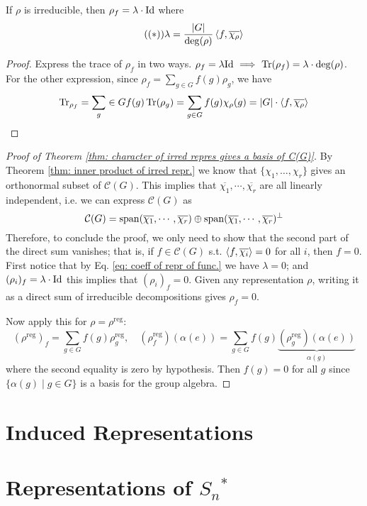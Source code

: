 \documentclass{article}
\begin{document}
\begin{proposition}
    If $\rho$ is irreducible, then $\rho_f = \lambda \cdot \mathrm{Id}$ where
    \begin{equation}\label{eq: coeff of repr of func.}\tag{$(\ast)$}
        \lambda = \frac{\left|G\right|}{\deg(\rho)} \left\langle f, \overline{\chi_{\rho}} \right\rangle
    \end{equation}
\end{proposition}

\begin{proof}
    Express the trace of $\rho_f$ in two ways. $\rho_f = \lambda \mathrm{Id} \ \Longrightarrow\  \operatorname{Tr}(\rho_f) = \lambda \cdot \deg(\rho)$. For the other expression, since $\rho_f = \sum_{g \in G} f(g) \rho_g$, we have
    \[
        \operatorname{Tr}_{\rho_f} = \sum_g \in G f(g) \operatorname{Tr}(\rho_g) = \sum_{g \in G} f(g) \chi_{\rho}(g) = \left|G\right| \cdot \left\langle f, \overline{\chi_{\rho}} \right\rangle
    \]
\end{proof}

\begin{proof}[Proof of Theorem \ref{thm: character of irred repres gives a basis of C(G)}]
    By Theorem \ref{thm: inner product of irred repr.} we know that $\{\chi_1, \dots, \chi_r\}$ gives an orthonormal subset of $\mathcal{C}(G)$. This implies that $\overline{\chi_{1}}, \cdots, \overline{\chi_{r}}$ are all linearly independent, i.e. we can express $\mathcal{C}(G)$ as
    \[
        \mathcal{C}(G) = \operatorname{span}(\overline{\chi_{1}}, \cdots, \overline{\chi_{r}}) \oplus \operatorname{span}(\overline{\chi_{1}}, \cdots, \overline{\chi_{r}})^{\perp}
    \]
    Therefore, to conclude the proof, we only need to show that the second part of the direct sum vanishes; that is, if $f \in \mathcal{C}(G)$ s.t. $\left\langle f, \overline{\chi_i} \right\rangle = 0$ for all $i$, then $f = 0$. First notice that by Eq. \eqref{eq: coeff of repr of func.} we have $\lambda = 0$; and $(\rho_i)_f = \lambda \cdot \mathrm{Id}$ this implies that $(\rho_i)_f = 0$. Given any representation $\rho$, writing it as a direct sum of irreducible decompositions gives $\rho_f = 0$.

    Now apply this for $\rho = \rho^{\text{reg}}$:
    \[
        (\rho^{\text{reg}})_f = \sum_{g \in G} f(g) \rho^{\text{reg}}_g, \quad (\rho^{\text{reg}}_f) (\alpha(e)) = \sum_{g \in G} f(g) \underbrace{(\rho^{\text{reg}}_g) (\alpha(e))}_{\alpha(g)}
    \]
    where the second equality is zero by hypothesis. Then $f(g) = 0$ for all $g$ since $\{\alpha(g) \mid g \in G\}$ is a basis for the group algebra.
\end{proof}

\section{Induced Representations}

\section{Representations of $S_n$$^{\ast}$}
\end{document}
